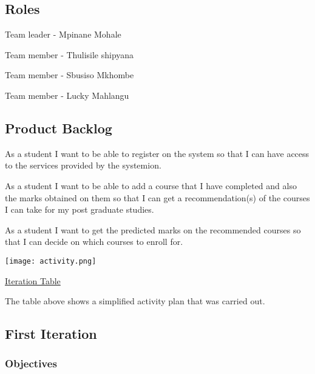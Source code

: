 \documentclass[10pt]{article}
\begin{document}
\subsection{Roles}

\begin{description}[font=$\bullet$~\normalfont\scshape\color{red!50!black}]

\item [] Team leader - Mpinane Mohale
\item [] Team member - Thulisile shipyana
\item [] Team member -  Sbusiso Mkhombe
\item [] Team member - Lucky Mahlangu
 
\end{description}

\subsection{Product Backlog}

\begin{description}[font=$\bullet$~\normalfont\scshape\color{red!50!black}]

\item [] As a student I want to be able to register on the system so that I can have access to the services provided by the systemion.
\item [] As a student I want to be able to add a course that I have completed and also the marks obtained on them so that I can get a recommendation(s) of the courses I can take for my post graduate studies.
\item [] As a student I want to get the predicted marks on the recommended courses so that I can decide on which courses to enroll for.
\end{description}

\begin{center}
\texttt{[image: activity.png]}
\end{center}
\caption{\underline{Iteration Table}}
The table above shows a simplified activity plan that was carried out. 

\subsection{First Iteration}

\subsubsection{Objectives}
\end{document}
